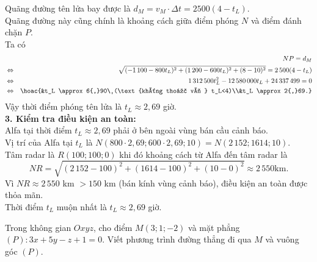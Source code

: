 \begin{bt}
{		Quãng đường tên lửa bay được là $d_M=v_M \cdot \Delta  t=2500(4-t_L)$.\\
		 Quãng đường này cũng chính là khoảng cách giữa điểm phóng $N$ và điểm đánh chặn $P$.\\
		 Ta có \allowdisplaybreaks
		\begin{eqnarray*}
			&&NP=d_M\\ 
			&\Leftrightarrow&  \sqrt{(-1\,100-800t_L)^2+(1\,200-600t_L)^2+(8-10)^2}=2\,500(4-t_L)\\
			&\Leftrightarrow&1\,312\,500t_L^2-12\,580\,000t_L+24\,337\,499=0\\ 
			&\Leftrightarrow&\hoac {&t_L \approx 6{,}90\ (\text  {không thoả vì } t_L<4)\\&t_L \approx 2{,}69.}
		\end{eqnarray*}
		Vậy thời điểm phóng tên lửa là $t_L \approx 2{,}69$  giờ.\\
		\textbf{3.  Kiểm tra điều kiện an toàn:}\\
		Alfa tại thời điểm $t_L  \approx 2{,}69$ phải ở bên ngoài vùng bán cầu cảnh báo.\\
		Vị trí của Alfa tại $t_L$ là $N(800 \cdot 2{,}69; 600 \cdot 2{,}69;  10)=N(2\,152; 1614; 10)$.\\
		Tâm radar là $R(100;100;0)$ khi  đó khoảng cách từ Alfa đến tâm radar là
		\[NR=\sqrt{(2\,152-100)^2+(1614-100)^2+(10-0)^2}  \approx 2\,550 \text {km.}\]
		Vì $NR \approx 2\,550$ km $> 150$ km (bán kính vùng cảnh báo), điều  kiện an toàn được thỏa mãn.\\ Thời điểm $t_L$ muộn nhất là $t_L \approx 2{,}69$ giờ.\\
	} 
\end{bt}



\begin{bt}%
	Trong không gian $Oxyz$, cho điểm $M(3;1;-2)$ và mặt  phẳng $(P)\colon 3x+5y-z+1=0$. Viết phương trình đường thẳng đi qua $M$ và vuông góc $(P)$.
\end{bt}

